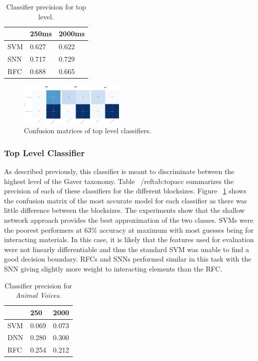 \begin{table}[h]
    \begin{tabular}{lll}
        & 250ms   & 2000ms  \\ \hline
    SVM & 0.627 & 0.622 \\
    SNN & 0.717 & 0.729 \\
    RFC & 0.688 & 0.665
    \end{tabular}
    \caption{Classifier precision for top level.}
    \label{tab:topacc}
\end{table}

\begin{figure}[h]
    \centering
    \includegraphics[width=0.45\textwidth]{figures/Top_Level_Comparison.png}
    \caption{Confusion matrices of top level classifiers.}
    \label{fig:TopClass}
\end{figure}

\subsubsection{Top Level Classifier}
As described previously, this classifier is meant to discriminate between the highest level of the Gaver taxonomy. Table ~/ref{tab:topacc} summarizes the precision of each of these classifiers for the different blocksizes. Figure ~\ref{fig:TopClass} shows the confusion matrix of the most accurate model for each classifier as there was little difference between the blocksizes. The experiments show that the shallow network approach provides the best approximation of the two classes. SVMs were the poorest performers at 63\% accuracy at maximum with most guesses being for interacting materials. In this case, it is likely that the features used for evaluation were not linearly differentiable and thus the standard SVM was unable to find a good decision boundary. RFCs and SNNs performed similar in this task with the SNN giving slightly more weight to interacting elements than the RFC.

\begin{table}[h]
    \caption{Classifier precision for \textit{Animal Voices}.}
    \label{tab:animvocprec}
    \begin{tabular}{lll}
        & 250   & 2000  \\ \hline
    SVM & 0.069 & 0.073 \\
    DNN & 0.280 & 0.300 \\
    RFC & 0.254 & 0.212
    \end{tabular}
\end{table}

